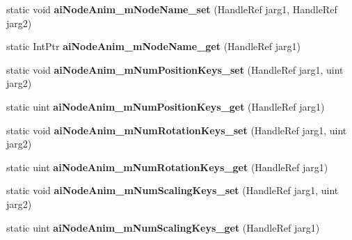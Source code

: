 \begin{DoxyCompactItemize}
\item 
\hypertarget{class_assimp_p_i_n_v_o_k_e_a6a03e035d1763abc55ddf6175bb96e7c}{static void {\bfseries ai\+Node\+Anim\+\_\+m\+Node\+Name\+\_\+set} (Handle\+Ref jarg1, Handle\+Ref jarg2)}\label{class_assimp_p_i_n_v_o_k_e_a6a03e035d1763abc55ddf6175bb96e7c}

\item 
\hypertarget{class_assimp_p_i_n_v_o_k_e_a60fc498d6a06dee8146fcdf13969a6f5}{static Int\+Ptr {\bfseries ai\+Node\+Anim\+\_\+m\+Node\+Name\+\_\+get} (Handle\+Ref jarg1)}\label{class_assimp_p_i_n_v_o_k_e_a60fc498d6a06dee8146fcdf13969a6f5}

\item 
\hypertarget{class_assimp_p_i_n_v_o_k_e_a16597f4f50560957581219caef407a02}{static void {\bfseries ai\+Node\+Anim\+\_\+m\+Num\+Position\+Keys\+\_\+set} (Handle\+Ref jarg1, uint jarg2)}\label{class_assimp_p_i_n_v_o_k_e_a16597f4f50560957581219caef407a02}

\item 
\hypertarget{class_assimp_p_i_n_v_o_k_e_ab0f5f8cfa58b041c9055047644710de5}{static uint {\bfseries ai\+Node\+Anim\+\_\+m\+Num\+Position\+Keys\+\_\+get} (Handle\+Ref jarg1)}\label{class_assimp_p_i_n_v_o_k_e_ab0f5f8cfa58b041c9055047644710de5}

\item 
\hypertarget{class_assimp_p_i_n_v_o_k_e_a6a0ca2c392322f97d66fd399475e260e}{static void {\bfseries ai\+Node\+Anim\+\_\+m\+Num\+Rotation\+Keys\+\_\+set} (Handle\+Ref jarg1, uint jarg2)}\label{class_assimp_p_i_n_v_o_k_e_a6a0ca2c392322f97d66fd399475e260e}

\item 
\hypertarget{class_assimp_p_i_n_v_o_k_e_aa30aaf80d102fe49148ca81aaa22f9dd}{static uint {\bfseries ai\+Node\+Anim\+\_\+m\+Num\+Rotation\+Keys\+\_\+get} (Handle\+Ref jarg1)}\label{class_assimp_p_i_n_v_o_k_e_aa30aaf80d102fe49148ca81aaa22f9dd}

\item 
\hypertarget{class_assimp_p_i_n_v_o_k_e_a46652f664d37d3ea601d626952eb59e9}{static void {\bfseries ai\+Node\+Anim\+\_\+m\+Num\+Scaling\+Keys\+\_\+set} (Handle\+Ref jarg1, uint jarg2)}\label{class_assimp_p_i_n_v_o_k_e_a46652f664d37d3ea601d626952eb59e9}

\item 
\hypertarget{class_assimp_p_i_n_v_o_k_e_a0363ddf4f68d34d8197a7f78420614ae}{static uint {\bfseries ai\+Node\+Anim\+\_\+m\+Num\+Scaling\+Keys\+\_\+get} (Handle\+Ref jarg1)}\label{class_assimp_p_i_n_v_o_k_e_a0363ddf4f68d34d8197a7f78420614ae}


\end{DoxyCompactItemize}
